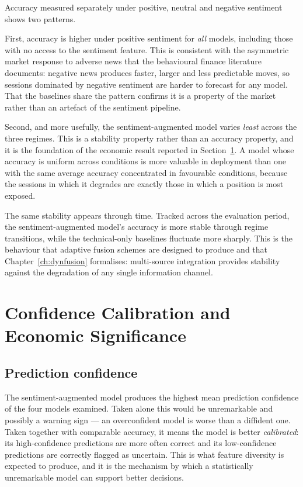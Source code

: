Accuracy measured separately under positive, neutral and negative sentiment shows two patterns.

First, accuracy is higher under positive sentiment for \emph{all} models, including those with no
access to the sentiment feature. This is consistent with the asymmetric market response to adverse
news that the behavioural finance literature documents: negative news produces faster, larger and
less predictable moves, so sessions dominated by negative sentiment are harder to forecast for any
model. That the baselines share the pattern confirms it is a property of the market rather than an
artefact of the sentiment pipeline.

Second, and more usefully, the sentiment-augmented model varies \emph{least} across the three
regimes. This is a stability property rather than an accuracy property, and it is the foundation
of the economic result reported in Section~\ref{sec:llm-economic}. A model whose accuracy is
uniform across conditions is more valuable in deployment than one with the same average accuracy
concentrated in favourable conditions, because the sessions in which it degrades are exactly those
in which a position is most exposed.

The same stability appears through time. Tracked across the evaluation period, the
sentiment-augmented model's accuracy is more stable through regime transitions, while the
technical-only baselines fluctuate more sharply. This is the behaviour that adaptive fusion
schemes are designed to produce and that Chapter~\ref{ch:dynfusion} formalises: multi-source
integration provides stability against the degradation of any single information channel.

\section{Confidence Calibration and Economic Significance}
\label{sec:llm-economic}

\subsection{Prediction confidence}

The sentiment-augmented model produces the highest mean prediction confidence of the four models
examined. Taken alone this would be unremarkable and possibly a warning sign --- an overconfident
model is worse than a diffident one. Taken together with comparable accuracy, it means the model
is better \emph{calibrated}: its high-confidence predictions are more often correct and its
low-confidence predictions are correctly flagged as uncertain. This is what feature diversity is
expected to produce, and it is the mechanism by which a statistically unremarkable model can
support better decisions.

